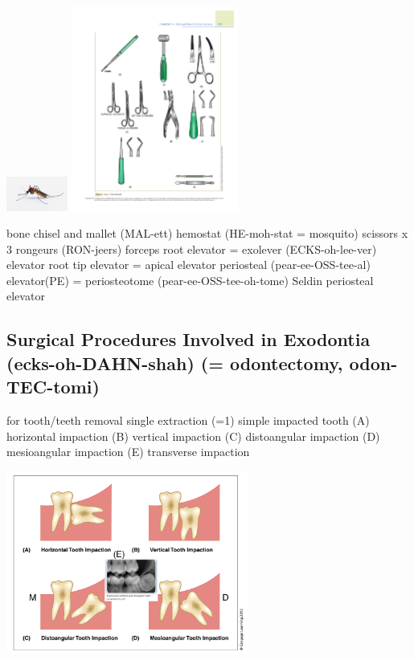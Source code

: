 \documentclass[
paper=landscape,
paper=160mm:90mm, %
fontsize=11pt, %
pagesize, %
parskip=half-, %
]{scrartcl} %
\newenvironment{WrapText1}[3][r]
{\wrapfigure[#2]{#1}{#3}}
{\endwrapfigure}
\newcommand{\wrapr}[6]{
\begin{minipage}{\linewidth}\mbox{}\\
\vspace{#1}
\begin{WrapText1}{#2}{#3}
\vspace{#4}#5\end{WrapText1}#6
\end{minipage}}
\theoremstyle{mythmstyle} %
\begin{document}
\wrapr{-8mm}{7}{6cm}{-5mm}
{%
\includegraphics[width=2cm]{mosquito.png}
\includegraphics[width=5.5cm]{p257.pdf}

} %
{%
\begin{outline}
\1 bone chisel and mallet (MAL-ett)
\1 hemostat (HE-moh-stat = mosquito)
\1 scissors x 3
\1 rongeurs (RON-jeers) forceps %
\1 root elevator = exolever (ECKS-oh-lee-ver) elevator
\1 root tip elevator = apical elevator %
\1 periosteal (pear-ee-OSS-tee-al) elevator(PE) = periosteotome  (pear-ee-OSS-tee-oh-tome)
\1 Seldin periosteal elevator
\end{outline}
} %


\clearpage
\subsection{Surgical Procedures Involved in Exodontia (ecks-oh-DAHN-shah) (= odontectomy, odon-TEC-tomi)}
 
\begin{minipage}[c]{0.45\linewidth}
\begin{outline}
\0 for tooth/teeth removal
\1 single extraction (=1)
\2 simple
\2 impacted tooth
    \3 (A) horizontal impaction
    \3 (B) vertical impaction
    \3 (C) distoangular impaction
    \3 (D) mesioangular impaction
    \3 (E) transverse impaction
\end{outline}

\end{minipage}
\begin{minipage}[c]{0.5\linewidth}

\includegraphics[width=8.0cm]{p258.png}
\end{minipage}
\end{document}
